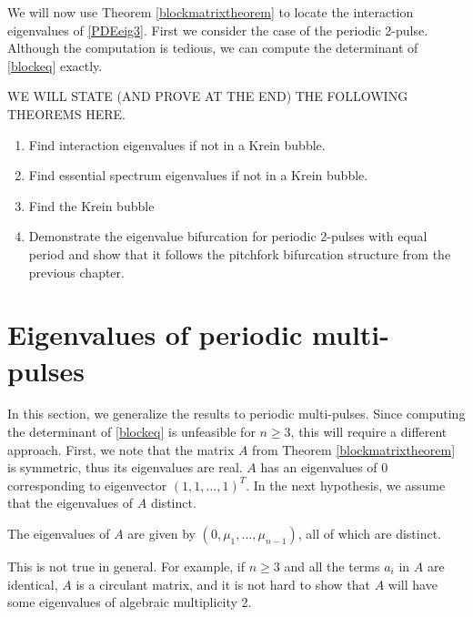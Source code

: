 \documentclass[thesis.tex]{subfiles}
\begin{document}
We will now use Theorem \ref{blockmatrixtheorem} to locate the interaction eigenvalues of \eqref{PDEeig3}. First we consider the case of the periodic 2-pulse. Although the computation is tedious, we can compute the determinant of \cref{blockeq} exactly. 

WE WILL STATE (AND PROVE AT THE END) THE FOLLOWING THEOREMS HERE.
\begin{enumerate}
\item Find interaction eigenvalues if not in a Krein bubble.
\item Find essential spectrum eigenvalues if not in a Krein bubble.
\item Find the Krein bubble
\item Demonstrate the eigenvalue bifurcation for periodic 2-pulses with equal period and show that it follows the pitchfork bifurcation structure from the previous chapter.
\end{enumerate}

\section{Eigenvalues of periodic multi-pulses}

In this section, we generalize the results to periodic multi-pulses. Since computing the determinant of \cref{blockeq} is unfeasible for $n \geq 3$, this will require a different approach. First, we note that the matrix $A$ from Theorem \ref{blockmatrixtheorem} is symmetric, thus its eigenvalues are real. $A$ has an eigenvalues of 0 corresponding to eigenvector $(1, 1, \dots, 1)^T$. In the next hypothesis, we assume that the eigenvalues of $A$ distinct. 

\begin{hypothesis}\label{Adistincteigs}
The eigenvalues of $A$ are given by $(0, \mu_1, \dots, \mu_{n-1})$, all of which are distinct.
\end{hypothesis}

\noi This is not true in general. For example, if $n \geq 3$ and all the terms $a_i$ in $A$ are identical, $A$ is a circulant matrix, and it is not hard to show that $A$ will have some eigenvalues of algebraic multiplicity 2.
\end{document}
